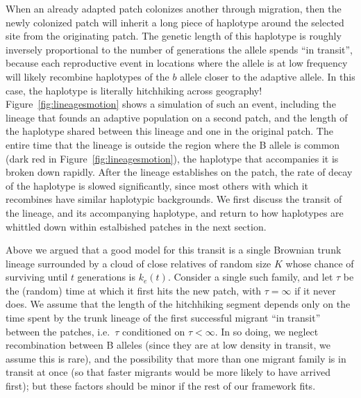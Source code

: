 \documentclass{article}
\begin{document}
When an already adapted patch colonizes another through migration,
then the newly colonized patch will inherit a long piece of haplotype around the selected site from the originating patch.
The genetic length of this haplotype is roughly inversely proportional to the
number of generations the allele spends ``in transit'', 
because each reproductive event in locations where the allele is at
low frequency will likely recombine haplotypes of the $b$ allele closer to the adaptive allele. 
In this case, the haplotype is literally hitchhiking across geography!
Figure~\ref{fig:lineagesmotion} shows a simulation of such an event,
including the lineage that founds an adaptive population on a second patch,
and the length of the haplotype shared between this lineage and one in the original patch.
The entire time that the lineage is outside the region where the B allele is common (dark red in Figure~\ref{fig:lineagesmotion}), 
the haplotype that accompanies it is broken down rapidly. 
After the lineage establishes on the patch, the rate of decay of the haplotype is slowed significantly, 
since most others with which it recombines have similar haplotypic backgrounds. 
We first discuss the transit of the lineage, and its accompanying haplotype, and return
to how haplotypes are whittled down within estalbished patches in the next section.


Above we argued that a good model for this transit is a single Brownian trunk lineage
surrounded by a cloud of close relatives of random size $K$
whose chance of surviving until $t$ generations is $k_e(t)$.
Consider a single such family, and let $\tau$ be the (random) time at which it first hits the new patch,
with $\tau = \infty$ if it never does. 
We assume that the length of the hitchhiking segment depends only on 
the time spent by the trunk lineage of the first successful migrant ``in transit'' between the patches,
i.e.\ $\tau$ conditioned on $\tau < \infty$.
In so doing, we neglect 
recombination between B alleles (since they are at low density in transit, we assume this is rare),
and the possibility that more than one migrant family is in transit at once
(so that faster migrants would be more likely to have arrived first);
but these factors should be minor if the rest of our framework fits.
\end{document}
